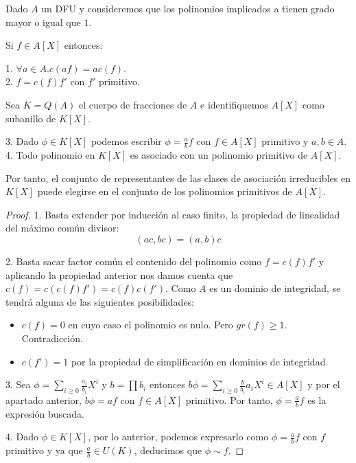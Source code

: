 \begin{lemma}
Dado $A$ un DFU y consideremos que los polinomios implicados a tienen grado mayor o igual que $1$. 

Si $f \in A[X]$ entonces:

1. $\forall a \in A. c(af) = ac(f)$. \\
2. $f = c(f)f'$ con $f'$ primitivo.

Sea $K = Q(A)$ el cuerpo de fracciones de $A$ e identifiquemos $A[X]$ como subanillo de $K[X]$. 

3. Dado $\phi \in K[X]$ podemos escribir $\phi = \frac{a}{b}f$ con $f \in A[X]$ primitivo y $a,b \in A$.\\
4. Todo polinomio en $K[X]$ es asociado con un polinomio primitivo de $A[X]$. 

Por tanto, el conjunto de representantes de las clases de asociación irreducibles en $K[X]$ puede elegirse en el conjunto de los polinomios primitivos de $A[X]$.
\end{lemma}
\begin{proof}
1. Basta extender por inducción al caso finito, la propiedad de linealidad del máximo común divisor: $$(ac,bc) = (a,b)c$$

2. Basta sacar factor común el contenido del polinomio como $f = c(f)f'$ y aplicando la propiedad anterior nos damos cuenta que $c(f) = c(c(f)f') = c(f)c(f')$. Como $A$ es un dominio de integridad, se tendrá alguna de las siguientes posibilidades:

\begin{itemize}
\item $c(f) = 0$ en cuyo caso el polinomio es nulo. Pero $gr(f) \ge 1$. Contradicción. 
\item $c(f') = 1$ por la propiedad de simplificación en dominios de integridad.
\end{itemize} 

3. Sea $\phi = \sum_{i \ge 0} \frac{a_i}{b_i} X^i$ y $b = \prod b_i$ entonces $b\phi = \sum_{i \ge 0} \frac{b}{b_i}a_iX^i \in A[X]$ y por el apartado anterior, $b\phi = af$ con $f \in A[X]$ primitivo. Por tanto, $\phi = \frac{a}{b}f$ es la expresión buscada. 

4. Dado $\phi \in K[X]$, por lo anterior, podemos expresarlo como $\phi = \frac{a}{b}f$ con $f$ primitivo y ya que $\frac{a}{b} \in U(K)$, deducimos que $\phi \sim f$.  
\end{proof}

